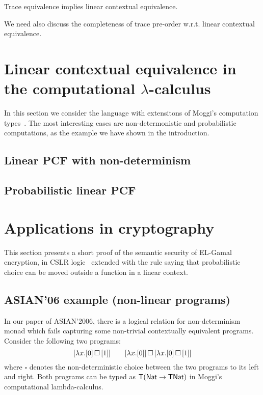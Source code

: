 \documentclass[10pt,a4]{article}
\begin{document}
\begin{corollary}
Trace equivalence implies linear contextual equivalence.
\end{corollary}

We need also discuss the completeness of trace pre-order w.r.t. linear contextual equivalence. 


\section{Linear contextual equivalence in the computational $\lambda$-calculus}

In this section we consider the language with extensitons of Moggi's computation types~\cite{Moggi}. 
The most interesting cases are non-determonistic and probabilistic computations, as the example 
we have shown in the introduction.

\subsection{Linear PCF with non-determinism}


\subsection{Probabilistic linear PCF}



\section{Applications in cryptography}

This section presents a short proof of the semantic security of EL-Gamal encryption, in CSLR logic~\cite{} 
extended with the rule saying that probabilistic choice can be moved outside a function in a linear context.

\subsection{ASIAN'06 example (non-linear programs)}

In our paper of ASIAN'2006, there is a logical relation for non-determinism monad which fails 
capturing some non-trivial contextually equivalent programs. 
Consider the following two programs:
\[
[\lambda x. [0] \,\square\, [1]]
\qquad 
[\lambda x. [0]] \,\square\, [\lambda x. [0] \,\square\, [1]]
\]
where $\square$ denotes the non-deterministic choice between the two programs to its left and right.
Both programs can be typed as $\mathsf{T}(\mathsf{Nat} \to \mathsf{T} \mathsf{Nat})$ in Moggi's computational lambda-calculus.
\end{document}
